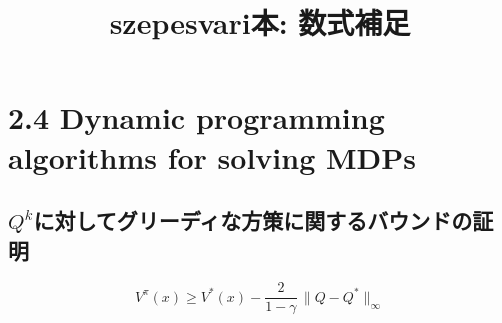 \documentclass{jsarticle}
\date{}
\title{szepesvari本: 数式補足}
\newcommand{\st}{x}
\begin{document}
\maketitle

\section*{2.4 Dynamic programming algorithms for solving MDPs}

\subsection*{$Q^{k}$に対してグリーディな方策に関するバウンドの証明}
\begin{equation}
V^\pi(\st) \ge V^*(\st) - \frac{2}{1-\gamma} \, \|Q-Q^*\|_{\infty}
\end{equation}
\end{document}
